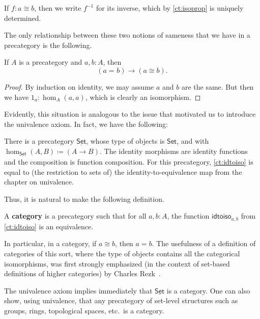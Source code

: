 \documentclass{amsart}
\newcommand{\defeq}{\coloneqq}  %
\newcommand{\id}[3][]{\ensuremath{#2 =_{#1} #3}\xspace}
\renewcommand{\set}{\ensuremath{\mathsf{Set}}\xspace}
\newcommand{\uset}{\ensuremath{\underline{\set}}\xspace}
\theoremstyle{definition}
\theoremstyle{remark}
\numberwithin{equation}{section}
\newcommand{\inv}[1]{{#1}^{-1}}
\newcommand{\idtoiso}{\ensuremath{\mathsf{idtoiso}}\xspace}
\begin{document}
If $f:a\cong b$, then we write $\inv f$ for its inverse, which by \autoref{ct:isoprop} is uniquely determined.

The only relationship between these two notions of sameness that we have in a precategory is the following.

\begin{lem}\label{ct:idtoiso}
  If $A$ is a precategory and $a,b:A$, then
  \[(\id a b)\to (a \cong b).\]
\end{lem}
\begin{proof}
  By induction on identity, we may assume $a$ and $b$ are the same.
  But then we have $1_a:\hom_A(a,a)$, which is clearly an isomorphism.
\end{proof}

Evidently, this situation is analogous to the issue that motivated us to introduce the univalence axiom.
In fact, we have the following:

\begin{eg}\label{ct:precatset}
  There is a precategory \uset, whose type of objects is \set, and with $\hom_{\uset}(A,B) \defeq (A\to B)$.
  The identity morphisms are identity functions and the composition is function composition.
  For this precategory, \autoref{ct:idtoiso} is equal to (the restriction to sets of) the identity-to-equivalence map from the chapter on univalence.
\end{eg}

Thus, it is natural to make the following definition.

\begin{defn}\label{ct:category}
  A \textbf{category} is a precategory such that for all $a,b:A$, the function $\idtoiso_{a,b}$ from \autoref{ct:idtoiso} is an equivalence.
\end{defn}

In particular, in a category, if $a\cong b$, then $a=b$.
The usefulness of a definition of categories of this sort, where the type of objects contains all the categorical isomorphisms, was first strongly emphasized (in the context of set-based definitions of higher categories) by Charles Rezk~\cite{rezk01css}.

\begin{eg}\label{ct:eg:set}
  The univalence axiom implies immediately that \uset is a category.
  One can also show, using univalence, that any precategory of set-level structures such as groups, rings, topological spaces, etc.\ is a category.
\end{eg}
\end{document}
